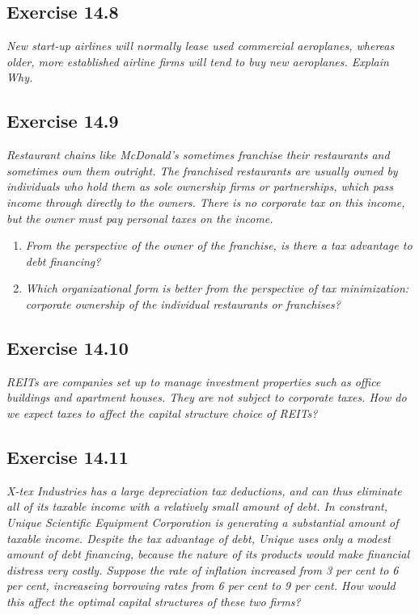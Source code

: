 \documentclass[]{book}
\theoremstyle{definition}
\theoremstyle{definition}
\theoremstyle{remark}
\begin{document}
\subsection{Exercise 14.8}\label{exercise-14.8}

\emph{New start-up airlines will normally lease used commercial
aeroplanes, whereas older, more established airline firms will tend to
buy new aeroplanes. Explain Why.} \citep[p.493]{book}

\subsection{Exercise 14.9}\label{exercise-14.9}

\emph{Restaurant chains like McDonald's sometimes franchise their
restaurants and sometimes own them outright. The franchised restaurants
are usually owned by individuals who hold them as sole ownership firms
or partnerships, which pass income through directly to the owners. There
is no corporate tax on this income, but the owner must pay personal
taxes on the income.} \citep[p.493]{book}

\begin{enumerate}
\def\labelenumi{\alph{enumi}.}
\item
  \emph{From the perspective of the owner of the franchise, is there a
  tax advantage to debt financing?} \citep[p.493]{book}
\item
  \emph{Which organizational form is better from the perspective of tax
  minimization: corporate ownership of the individual restaurants or
  franchises?} \citep[p.493]{book}
\end{enumerate}

\subsection{Exercise 14.10}\label{exercise-14.10}

\emph{REITs are companies set up to manage investment properties such as
office buildings and apartment houses. They are not subject to corporate
taxes. How do we expect taxes to affect the capital structure choice of
REITs?} \citep[p.493]{book}

\subsection{Exercise 14.11}\label{exercise-14.11}

\emph{X-tex Industries has a large depreciation tax deductions, and can
thus eliminate all of its taxable income with a relatively small amount
of debt. In constrant, Unique Scientific Equipment Corporation is
generating a substantial amount of taxable income. Despite the tax
advantage of debt, Unique uses only a modest amount of debt financing,
because the nature of its products would make financial distress very
costly. Suppose the rate of inflation increased from 3 per cent to 6 per
cent, increaseing borrowing rates from 6 per cent to 9 per cent. How
would this affect the optimal capital structures of these two firms?}
\citep[p.493]{book}
\end{document}
